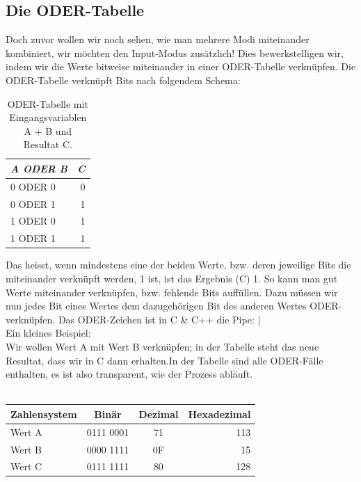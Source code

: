 \documentclass[b5paper,10pt,dvips,fleqn,titlepage,twoside]{book}
\begin{document}
\subsection{Die ODER-Tabelle}
Doch zuvor wollen wir noch sehen, wie man mehrere Modi miteinander kombiniert, wir möchten den Input-Modus zus\"{a}tzlich! Dies bewerkstelligen wir, indem wir die Werte bitweise miteinander in einer ODER-Tabelle verkn\"{u}pfen. Die ODER-Tabelle verkn\"{u}pft Bits nach folgendem Schema:
\begin{center}
\begin{table}[h]
\caption[tab:ORtable]{ODER-Tabelle mit Eingangsvariablen A + B und Resultat C.}
\hspace*{1.5in}\begin{tabular}[t]{|p{1in}||r|}
\hline \emph{ A ODER B }& \emph{C}\\\hline\hline
0 ODER 0 & 0\\\hline
0 ODER 1 & 1\\\hline
1 ODER 0 & 1\\\hline
1 ODER 1 & 1\\\hline
\end{tabular}
\end{table}
\end{center}
Das heisst, wenn mindestens eine der beiden Werte, bzw. deren jeweilige Bits die miteinander verkn\"{u}pft werden, 1 ist, ist das Ergebnis (C) 1. So kann man gut Werte miteinander verkn\"{u}pfen, bzw. fehlende Bits auff\"{u}llen.\newline
Dazu müssen wir nun jedes Bit eines Wertes dem dazugehörigen Bit des anderen Wertes ODER-verknüpfen.
Das ODER-Zeichen ist in C \& C++ die Pipe: |\newline\\
Ein kleines Beispiel: \\
Wir wollen Wert A mit Wert B verkn\"{u}pfen; in der Tabelle steht das neue Resultat, dass wir in C dann erhalten.\newline In der Tabelle sind alle ODER-Fälle enthalten, es ist also transparent, wie der Prozess abläuft.
\\\\
\hspace*{0.7in}\begin{tabular}[h]{|l|c|c|r|}
\hline Zahlensystem & Binär & Dezimal & Hexadezimal \\\hline\hline
Wert A & 0111 0001 & 71 & 113 \\
Wert B & 0000 1111 & 0F &  15 \\ \hline
Wert C & 0111 1111 & 80 & 128 \\ \hline
\end{tabular}
\newpage
\end{document}
